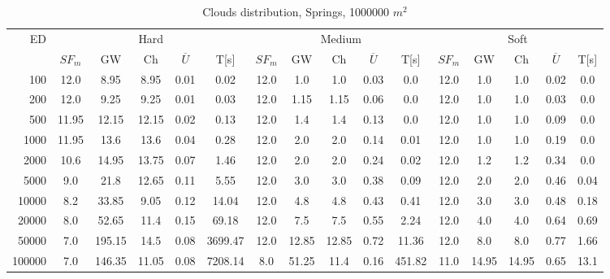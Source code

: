 \begin{table}[htb]
	\centering
	\footnotesize
	\begin{tabular}{|r|c|c|c|c|c|c|c|c|c|c|c|c|c|c|c|} 
		\hline
		\multirow{2}{*}{ED} & \multicolumn{5}{c|}{Hard} & \multicolumn{5}{c|}{Medium} &\multicolumn{5}{c|}{Soft} \\ 
		\cline{2-16} 
		&$SF_{m}$&GW & Ch & $\overline{U}$&T[s] &$SF_{m}$&GW & Ch & $\overline{U}$ &T[s] &$SF_{m}$&GW & Ch & $\overline{U}$  & T[s]  \\ 
		\hline 
		100 & 12.0 & 8.95 & 8.95 & 0.01 & 0.02 & 12.0 & 1.0 & 1.0 & 0.03 & 0.0 & 12.0 & 1.0 & 1.0 & 0.02 & 0.0\\ 
		200 & 12.0 & 9.25 & 9.25 & 0.01 & 0.03 & 12.0 & 1.15 & 1.15 & 0.06 & 0.0 & 12.0 & 1.0 & 1.0 & 0.03 & 0.0\\ 
		500 & 11.95 & 12.15 & 12.15 & 0.02 & 0.13 & 12.0 & 1.4 & 1.4 & 0.13 & 0.0 & 12.0 & 1.0 & 1.0 & 0.09 & 0.0\\ 
		1000 & 11.95 & 13.6 & 13.6 & 0.04 & 0.28 & 12.0 & 2.0 & 2.0 & 0.14 & 0.01 & 12.0 & 1.0 & 1.0 & 0.19 & 0.0\\ 
		2000 & 10.6 & 14.95 & 13.75 & 0.07 & 1.46 & 12.0 & 2.0 & 2.0 & 0.24 & 0.02 & 12.0 & 1.2 & 1.2 & 0.34 & 0.0\\ 
		5000 & 9.0 & 21.8 & 12.65 & 0.11 & 5.55 & 12.0 & 3.0 & 3.0 & 0.38 & 0.09 & 12.0 & 2.0 & 2.0 & 0.46 & 0.04\\ 
		10000 & 8.2 & 33.85 & 9.05 & 0.12 & 14.04 & 12.0 & 4.8 & 4.8 & 0.43 & 0.41 & 12.0 & 3.0 & 3.0 & 0.48 & 0.18\\ 
		20000 & 8.0 & 52.65 & 11.4 & 0.15 & 69.18 & 12.0 & 7.5 & 7.5 & 0.55 & 2.24 & 12.0 & 4.0 & 4.0 & 0.64 & 0.69\\ 
		50000 & 7.0 & 195.15 & 14.5 & 0.08 & 3699.47 & 12.0 & 12.85 & 12.85 & 0.72 & 11.36 & 12.0 & 8.0 & 8.0 & 0.77 & 1.66\\ 
		100000 & 7.0 & 146.35 & 11.05 & 0.08 & 7208.14 & 8.0 & 51.25 & 11.4 & 0.16 & 451.82 & 11.0 & 14.95 & 14.95 & 0.65 & 13.1\\ 
		\hline 
	\end{tabular} 
	\caption{Clouds distribution, Springs, 1000000 $m^2$} 
	\label{tab:UnSprings1000} 
\end{table} 
